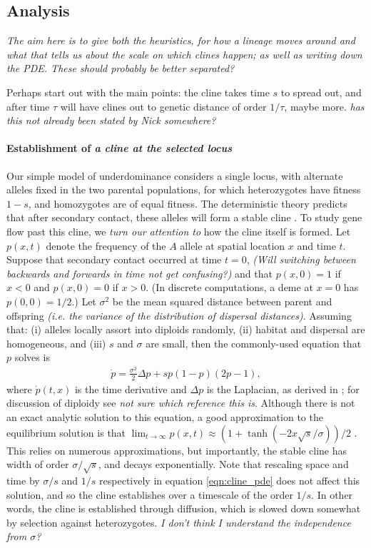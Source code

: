\documentclass[11pt,letterpaper]{article}
\newcommand{\alisa}[1]{{\em \color{red} #1}}
\newcommand{\plr}[1]{{\em \color{blue} #1}}
\begin{document}
\subsection*{Analysis}

\plr{The aim here is to give both the heuristics, for how a lineage moves around
and what that tells us about the scale on which clines happen;
as well as writing down the PDE.  These should probably be better separated?}

Perhaps start out with the main points:
the cline takes time $s$ to spread out,
and after time $\tau$ will have clines out to genetic distance of order $1/\tau$,
maybe more. \alisa{has this not already been stated by Nick somewhere?}

\paragraph{Establishment of  \alisa{a cline at the selected locus}}
Our simple model of underdominance considers a single locus, with alternate alleles fixed in the two parental populations,
for which heterozygotes have fitness $1-s$, and homozygotes are of equal fitness.
The deterministic theory predicts that after secondary contact,
these alleles will form a stable cline \citep{Barton1979}.
To study gene flow past this cline, we \alisa{turn our attention to} how the cline itself is formed.
Let $p(x,t)$ denote the frequency of the $A$ allele at spatial location $x$ and time $t$.  
Suppose that secondary contact occurred at time $t=0$, \alisa{(Will switching between backwards and forwards in time not get confusing?)}
and that $p(x,0) = 1$ if $x<0$ and $p(x,0)=0$ if $x>0$.
(In discrete computations, a deme at $x=0$ has $p(0,0)=1/2$.)
Let $\sigma^2$ be the mean squared distance between parent and offspring \alisa{(i.e. the variance of the distribution of dispersal distances)}.
Assuming that: (i) alleles locally assort into diploids randomly, (ii) habitat and dispersal are homogeneous, and (iii) $s$ and $\sigma$ are small, then the commonly-used equation that $p$ solves is
\begin{align} \label{eqn:cline_pde}
    \dot p = \frac{\sigma^2}{2} \Delta p + s p (1-p) (2p-1) ,
\end{align}
where $\dot p(t,x)$ is the time derivative and $\Delta p$ is the Laplacian,
as derived in \citep{Bazykin1969}; for discussion of diploidy see \citep{diploidcline} \alisa{not sure which reference this is}.
Although there is not an exact analytic solution to this equation, a good approximation to the equilibrium solution is that
$\lim_{t \to \infty} p(x,t) \approx (1+\tanh(-2x\sqrt{s}/\sigma))/2$ \citep{Bazykin1969}. This relies on numerous approximations, but importantly, the stable cline has width of order $\sigma/\sqrt{s}$,
and decays exponentially. Note that rescaling space and time by $\sigma/s$ and $1/s$ respectively in equation \eqref{eqn:cline_pde} does not affect this solution, and so the cline establishes over a timescale of the order $1/s$. In other words, the cline is established through diffusion, which is slowed down somewhat by selection against heterozygotes. \alisa{I don't think I understand the independence from $\sigma$?}
\end{document}
